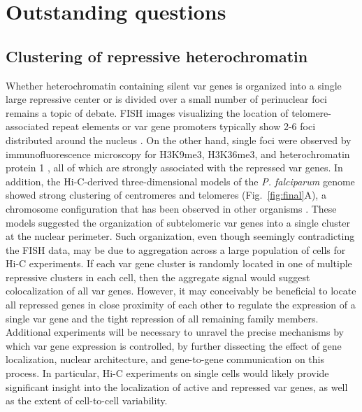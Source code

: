 \section{Outstanding questions}

\subsection{Clustering of repressive heterochromatin}

Whether heterochromatin containing silent var genes is organized into a single
large repressive center or is divided over a small number of perinuclear foci
remains a topic of debate. FISH images visualizing the location of
telomere-associated repeat elements or var gene promoters typically show 2-6
foci distributed around the nucleus \citep{lopez-rubio:genome-wide,
freitas-junior:frequent, ralph:antigenic, voss:var}. On the other hand, single
foci were observed by immunofluorescence microscopy for H3K9me3, H3K36me3, and
heterochromatin protein 1 \citep{ukaegbu:recruitment, dahan:pfsec13},
all of which are strongly associated with
the repressed var genes. In addition, the Hi-C-derived three-dimensional
models of the \textit{P. falciparum} genome showed strong clustering of centromeres and
telomeres \citep{ay:three-dimensional} (Fig.~\ref{fig:final}A), a
chromosome configuration that has been observed in
other organisms \citep{duan:three, tanizawa:mapping,
umbarger:three-dimensional}. These models suggested the organization of
subtelomeric var genes into a single cluster at the nuclear perimeter. Such
organization, even though seemingly contradicting the FISH data, may be due to
aggregation across a large population of cells for Hi-C experiments. If each
var gene cluster is randomly located in one of multiple repressive clusters in
each cell, then the aggregate signal would suggest colocalization of all var
genes. However, it may conceivably be beneficial to locate all repressed genes
in close proximity of each other to regulate the expression of a single var
gene and the tight repression of all remaining family members. Additional
experiments will be necessary to unravel the precise mechanisms by which var
gene expression is controlled, by further dissecting the effect of gene
localization, nuclear architecture, and gene-to-gene communication on this
process. In particular, Hi-C experiments on single cells would likely provide
significant insight into the localization of active and repressed var genes,
as well as the extent of cell-to-cell variability. 

